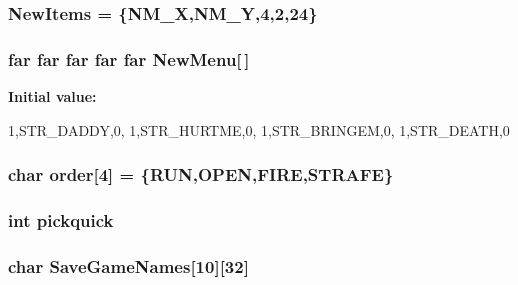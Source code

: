 \label{WL__MENU_8C_a85bfcab0002ae45a5d151750dee054d8}
\hypertarget{WL__MENU_8C_a4374f166e5cf27153b8a6680ae1d0289}{
\subsubsection[{NewItems}]{ {\bf NewItems} = \{NM\_\-X,NM\_\-Y,4,2,24\}}}
\label{WL__MENU_8C_a4374f166e5cf27153b8a6680ae1d0289}
\hypertarget{WL__MENU_8C_af9e9fe99a5785282fa54183df1cadb9d}{
\subsubsection[{NewMenu}]{ far far far far far {\bf NewMenu}\mbox{[}$\,$\mbox{]}}}
\label{WL__MENU_8C_af9e9fe99a5785282fa54183df1cadb9d}
{\bfseries Initial value:}
\begin{DoxyCode}

{






        {1,STR_DADDY,0},
        {1,STR_HURTME,0},
        {1,STR_BRINGEM,0},
        {1,STR_DEATH,0}

}
\end{DoxyCode}
\hypertarget{WL__MENU_8C_a907c3a6256dd10a071ee545d4249825a}{
\subsubsection[{order}]{\setlength{\rightskip}{0pt plus 5cm}char {\bf order}\mbox{[}4\mbox{]} = \{RUN,OPEN,FIRE,STRAFE\}}}
\label{WL__MENU_8C_a907c3a6256dd10a071ee545d4249825a}
\hypertarget{WL__MENU_8C_afe4c3831bb85073cc5118faefa59bee3}{
\subsubsection[{pickquick}]{\setlength{\rightskip}{0pt plus 5cm}int {\bf pickquick}}}
\label{WL__MENU_8C_afe4c3831bb85073cc5118faefa59bee3}
\hypertarget{WL__MENU_8C_a676a8d7bb5b64f29ab3ea8fe6a4f3242}{
\subsubsection[{SaveGameNames}]{\setlength{\rightskip}{0pt plus 5cm}char {\bf SaveGameNames}\mbox{[}10\mbox{]}\mbox{[}32\mbox{]}}}
